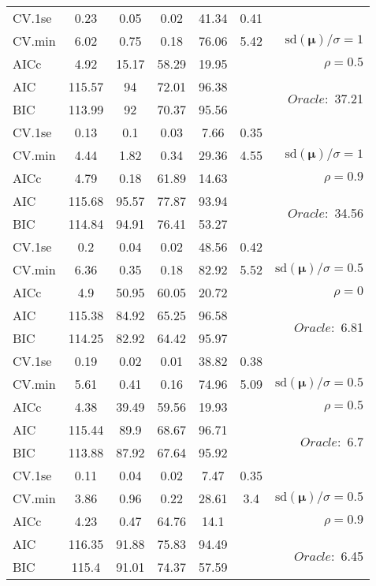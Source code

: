 \begin{table}
\begin{center}
\begin{tabular}{l*{5}{c}|r}
 \hline 
CV.1se & 0.23 & 0.05 & 0.02 & 41.34 & 0.41 & \\
CV.min & 6.02 & 0.75 & 0.18 & 76.06 & 5.42 &  $\mathrm{sd}(\mathbf{\mu})/\sigma=1$ \\
AICc & 4.92 & 15.17 & 58.29 & 19.95 & & $\rho=0.5$ \\
AIC & 115.57 & 94 & 72.01 & 96.38 & &  \multirow{2}{*}{$Oracle: $ 37.21} \\
BIC & 113.99 & 92 & 70.37 & 95.56 & &  \\
 \hline 
CV.1se & 0.13 & 0.1 & 0.03 & 7.66 & 0.35 & \\
CV.min & 4.44 & 1.82 & 0.34 & 29.36 & 4.55 &  $\mathrm{sd}(\mathbf{\mu})/\sigma=1$ \\
AICc & 4.79 & 0.18 & 61.89 & 14.63 & & $\rho=0.9$ \\
AIC & 115.68 & 95.57 & 77.87 & 93.94 & &  \multirow{2}{*}{$Oracle: $ 34.56} \\
BIC & 114.84 & 94.91 & 76.41 & 53.27 & &  \\
 \hline 
CV.1se & 0.2 & 0.04 & 0.02 & 48.56 & 0.42 & \\
CV.min & 6.36 & 0.35 & 0.18 & 82.92 & 5.52 &  $\mathrm{sd}(\mathbf{\mu})/\sigma=0.5$ \\
AICc & 4.9 & 50.95 & 60.05 & 20.72 & & $\rho=0$ \\
AIC & 115.38 & 84.92 & 65.25 & 96.58 & &  \multirow{2}{*}{$Oracle: $ 6.81} \\
BIC & 114.25 & 82.92 & 64.42 & 95.97 & &  \\
 \hline 
CV.1se & 0.19 & 0.02 & 0.01 & 38.82 & 0.38 & \\
CV.min & 5.61 & 0.41 & 0.16 & 74.96 & 5.09 &  $\mathrm{sd}(\mathbf{\mu})/\sigma=0.5$ \\
AICc & 4.38 & 39.49 & 59.56 & 19.93 & & $\rho=0.5$ \\
AIC & 115.44 & 89.9 & 68.67 & 96.71 & &  \multirow{2}{*}{$Oracle: $ 6.7} \\
BIC & 113.88 & 87.92 & 67.64 & 95.92 & &  \\
 \hline 
CV.1se & 0.11 & 0.04 & 0.02 & 7.47 & 0.35 & \\
CV.min & 3.86 & 0.96 & 0.22 & 28.61 & 3.4 &  $\mathrm{sd}(\mathbf{\mu})/\sigma=0.5$ \\
AICc & 4.23 & 0.47 & 64.76 & 14.1 & & $\rho=0.9$ \\
AIC & 116.35 & 91.88 & 75.83 & 94.49 & &  \multirow{2}{*}{$Oracle: $ 6.45} \\
BIC & 115.4 & 91.01 & 74.37 & 57.59 & &  \\
 \hline 
\end{tabular}
\end{center}
\vspace{-1cm}
\end{table}




